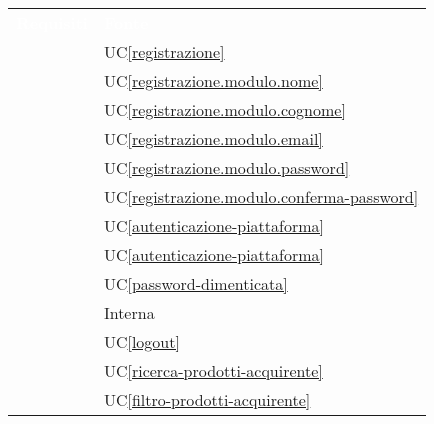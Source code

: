 \renewcommand{\arraystretch}{1.5}


\begin{longtable}{C{6cm} C{6cm}} 
	
	\textcolor{white}{\textbf{Requisiti}} &
	\textcolor{white}{\textbf{Fonte}} \\

     & UC\ref{registrazione} \\ 

     & UC\ref{registrazione.modulo.nome} \\

     & UC\ref{registrazione.modulo.cognome} \\

     & UC\ref{registrazione.modulo.email} \\

     & UC\ref{registrazione.modulo.password} \\

     & UC\ref{registrazione.modulo.conferma-password} \\

     & UC\ref{autenticazione-piattaforma} \\

     & UC\ref{autenticazione-piattaforma} \\

     & UC\ref{password-dimenticata} \\

     & Interna \\

     & UC\ref{logout} \\

     & UC\ref{ricerca-prodotti-acquirente} \\

     & UC\ref{filtro-prodotti-acquirente} \\


\end{longtable}
